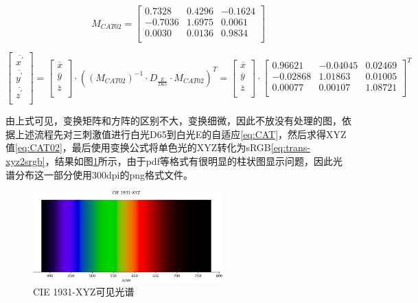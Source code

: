 \begin{equation}
    M_{CAT02} = \begin{bmatrix}
        0.7328  & 0.4296 & -0.1624\\
        -0.7036 & 1.6975 & 0.0061\\
        0.0030  & 0.0136 & 0.9834\\
    \end{bmatrix}
    \label{eq:CAT02}
\end{equation}

\begin{equation}
    \begin{bmatrix}
        \overline{x^\prime}\\
        \overline{y^\prime}\\
        \overline{z^\prime}\\
    \end{bmatrix} = \begin{bmatrix}
        \overline{x}\\
        \overline{y}\\
        \overline{z}\\
    \end{bmatrix}\cdot ((M_{CAT02})^{-1}\cdot D_\frac{E}{D65}\cdot M_{CAT02})^T = \begin{bmatrix}
        \overline{x}\\
        \overline{y}\\
        \overline{z}\\
    \end{bmatrix} \cdot \begin{bmatrix}
        0.96621  & -0.04045 & 0.02469\\
       -0.02868  &  1.01863 & 0.01005\\
        0.00077  &  0.00107 & 1.08721\\
    \end{bmatrix}^T
    \label{eq:CAT}
\end{equation}

由上式可见，变换矩阵和方阵的区别不大，变换细微，因此不放没有处理的图，依据上述流程先对三刺激值进行白光D65到白光E的自适应\eqref{eq:CAT}，然后求得XYZ值\eqref{eq:CAT02}，最后使用变换公式将单色光的XYZ转化为sRGB\eqref{eq:trans-xyz2srgb}，结果如图\ref{fig:wave}所示，由于pdf等格式有很明显的柱状图显示问题，因此光谱分布这一部分使用300dpi的png格式文件。

\begin{figure}[htbp]
    \centering
    \includegraphics[width=0.65\textwidth]{"./imgs/sec2/CIE 1931-XYZ-spd.png"}
    \caption{CIE 1931-XYZ可见光谱}
    \label{fig:wave}
\end{figure}


